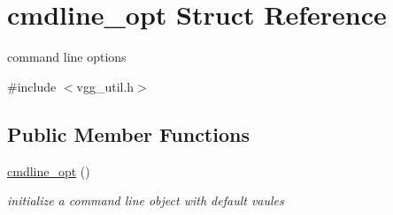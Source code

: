 \hypertarget{structcmdline__opt}{}\section{cmdline\+\_\+opt Struct Reference}
\label{structcmdline__opt}


command line options  




{\ttfamily \#include $<$vgg\+\_\+util.\+h$>$}

\subsection*{Public Member Functions}
\begin{DoxyCompactItemize}
\item 
\mbox{\label{structcmdline__opt_a389b760269a58bc462e8b429e4ef914e}} 
\hyperlink{structcmdline__opt_a389b760269a58bc462e8b429e4ef914e}{cmdline\+\_\+opt} ()
\begin{DoxyCompactList}\small\item\em initialize a command line object with default vaules \end{DoxyCompactList}\end{DoxyCompactItemize}

